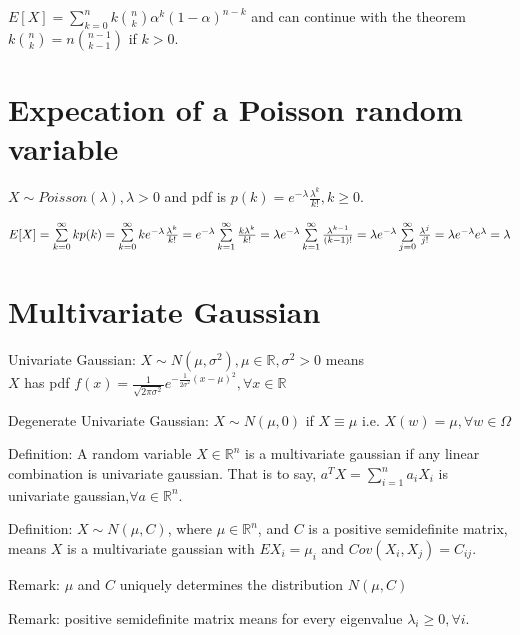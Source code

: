 \documentclass[12pt]{article}
\begin{document}
$E[X]
=\sum\limits_{k=0}^{n}k\binom{n}{k}\alpha^k(1-\alpha)^{n-k}$ and can continue
with the theorem $k\binom{n}{k}=n\binom{n-1}{k-1}$ if $k>0$.

\section{Expecation of a Poisson random variable}

$X\sim Poisson(\lambda),\lambda>0$ and pdf is $p(k)=e^{-\lambda}\frac{\lambda^k}{k!},k\ge 0$.

$E[X] \\
=\sum\limits_{k=0}^{\infty}kp(k)  \\
=\sum\limits_{k=0}^{\infty}ke^{-\lambda}\frac{\lambda^k}{k!} \\
=e^{-\lambda}\sum\limits_{k=1}^{\infty}\frac{k\lambda^k}{k!} \\
=\lambda e^{-\lambda}\sum\limits_{k=1}^{\infty}\frac{\lambda^{k-1}}{(k-1)!} \\
=\lambda e^{-\lambda}\sum\limits_{j=0}^{\infty}\frac{\lambda^j}{j!} \\
=\lambda e^{-\lambda}e^{\lambda} \\
=\lambda$

\section{Multivariate Gaussian}

Univariate Gaussian: $X\sim N(\mu, \sigma^2), \mu\in\mathbb{R},\sigma^2>0$
means \\ 
$X$ has pdf
$f(x)
=\frac{1}{\sqrt{2\pi\sigma^2}}e^{ -\frac{1}{2\sigma^2}(x-\mu)^2 },\forall x\in\mathbb{R}$

\bigbreak
Degenerate Univariate Gaussian: 
$X\sim N(\mu,0)$ if $X\equiv \mu$ i.e. $X(w)=\mu,\forall w\in\Omega$

Definition: A random variable $X\in\mathbb{R}^n$
is a multivariate gaussian
if any linear combination is univariate gaussian.
That is to say, $a^TX=\sum\limits_{i=1}^n a_i X_i$ is univariate gaussian,$\forall a\in\mathbb{R}^n$.

Definition: $X\sim N(\mu, C)$, where $\mu\in\mathbb{R}^n$, and $C$ is a positive semidefinite matrix, means $X$ is a multivariate gaussian
with $EX_i = \mu_i$ and $Cov(X_i,X_j)=C_{ij}$.

Remark: $\mu$ and $C$ uniquely determines the distribution $N(\mu,C)$

Remark: positive semidefinite matrix means for every eigenvalue $\lambda_i\ge 0,\forall i$.
\end{document}
